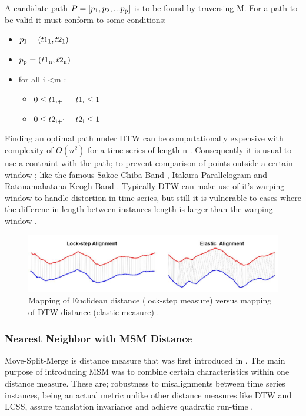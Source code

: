 A candidate path $P = [p\textsubscript{1},p\textsubscript{2},...p\textsubscript{p}]$ is to be found by traversing M.
For a path to be valid it must conform to some conditions:
\begin{itemize}
    \item $p\textsubscript{1} = (t1\textsubscript{1},t2\textsubscript{1})$
    \item $p\textsubscript{p} = (t1\textsubscript{n},t2\textsubscript{n})$
    \item for all i \textless m :
        \begin{itemize}
            \item $0 \leq t1\textsubscript{i+1} - t1\textsubscript{i} \leq 1$
            \item $0 \leq t2\textsubscript{i+1} - t2\textsubscript{i} \leq 1$
        \end{itemize}
\end{itemize}

Finding an optimal path under DTW can be computationally expensive with complexity of $O(n^2)$ for a time series of length n \cite{schafer2017fast,petitjean2016faster}.
Consequently it is usual to use a contraint with the path; to prevent comparison of points outside a certain window \cite{tan2020fastee}; like the famous Sakoe-Chiba Band \cite{sakoe1978dynamic}, Itakura Parallelogram \cite{itakura1975minimum} and Ratanamahatana-Keogh Band \cite{ratanamahatana2004making}.
Typically DTW can make use of it's warping window to handle distortion in time series,
but still it is vulnerable to cases where the differene in length between instances length is larger than the warping window \cite{tan2019time}.

\begin{figure}
    \captionsetup{justification=raggedright}
    \centering
    \includegraphics[scale = 0.5]{ED_vs_DTW.JPG}
    \centering
    \caption{Mapping of Euclidean distance (lock-step measure) versus mapping of DTW distance (elastic measure) \cite{abanda2019review}.}
    \label{Img:ED_vs_DTW}
\end{figure}

\subsubsection{Nearest Neighbor with MSM Distance}
\label{SubsubsectionMSM}
Move-Split-Merge is distance measure that was first introduced in \cite{stefan2012move}.
The main purpose of introducing MSM was to combine certain characteristics within one distance measure.
These are; robustness to misalignments between time series instances, being an actual metric unlike other distance measures like DTW and LCSS,
assure translation invariance and achieve quadratic run-time \cite{lines2015time}.

